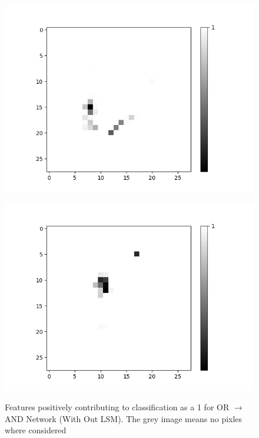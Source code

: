 \begin{minipage}[t]{0.6\textwidth}
\begin{figure}[H]
\begin{minipage}[b]{0.24\textwidth}
			\includegraphics[width=\textwidth]{OR-AND(WO-LSM)(1)/Like/False/Layer0-Neuron-10.png}
			\label{}
		\end{minipage}
		\begin{minipage}[b]{0.24\textwidth}
			\captionsetup{labelformat=empty}
			\includegraphics[width=\textwidth]{OR-AND(WO-LSM)(1)/Like/False/Layer0-Neuron-15.png}
			\label{}
		\end{minipage}
		\caption{Features positively contributing to classification as a 1 for OR $\rightarrow$ AND Network (With Out LSM). The grey image means no pixles where considered}
		\label{fig:or-and-net-without-lsm-pos}
		\hfill
	\end{figure}
\end{minipage}


